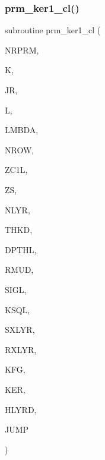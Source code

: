 \subsubsection{\texorpdfstring{prm\+\_\+ker1\+\_\+cl()}{prm\_ker1\_cl()}}
{\footnotesize\ttfamily subroutine prm\+\_\+ker1\+\_\+cl (\begin{DoxyParamCaption}\item[{integer}]{N\+R\+P\+RM,  }\item[{integer}]{K,  }\item[{integer}]{JR,  }\item[{integer}]{L,  }\item[{real(kind=ql)}]{L\+M\+B\+DA,  }\item[{integer}]{N\+R\+OW,  }\item[{real, dimension(nrow)}]{Z\+C1L,  }\item[{real(kind=ql)}]{ZS,  }\item[{integer}]{N\+L\+YR,  }\item[{real(kind=ql), dimension (nlyr)}]{T\+H\+KD,  }\item[{real(kind=ql), dimension (nlyr)}]{D\+P\+T\+HL,  }\item[{real(kind=ql), dimension(0\+:nlyr)}]{R\+M\+UD,  }\item[{complex(kind=ql), dimension (nlyr)}]{S\+I\+GL,  }\item[{complex(kind=ql), dimension (nlyr)}]{K\+S\+QL,  }\item[{integer}]{S\+X\+L\+YR,  }\item[{integer}]{R\+X\+L\+YR,  }\item[{integer}]{K\+FG,  }\item[{complex (kind=ql), dimension(jnlo-\/nrprm\+:jnhi,3,nrow)}]{K\+ER,  }\item[{complex (kind=ql), dimension(nrprm,3,nrow)}]{H\+L\+Y\+RD,  }\item[{logical}]{J\+U\+MP }\end{DoxyParamCaption})}

